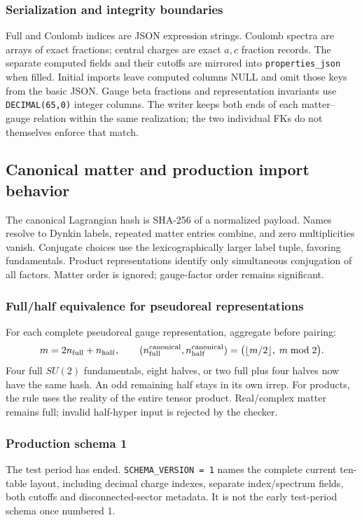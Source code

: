 \documentclass[11pt,a4paper]{article}
\numberwithin{equation}{section}
\newcommand{\code}[1]{{\small\nolinkurl{#1}}}
\begin{document}
\subsubsection{Serialization and integrity boundaries}
Full and Coulomb indices are JSON expression strings. Coulomb spectra are
arrays of exact fractions; central charges are exact $a,c$ fraction records.
The separate computed fields and their cutoffs are mirrored into
\code{properties_json} when filled. Initial imports leave computed columns
NULL and omit those keys from the basic JSON. Gauge beta
fractions and representation invariants use \code{DECIMAL(65,0)} integer
columns. The writer keeps both ends of each matter--gauge relation within the
same realization; the two individual FKs do not themselves enforce that match.

\clearpage
\subsection{Canonical matter and production import behavior}
The canonical Lagrangian hash is SHA-256 of a normalized payload. Names resolve
to Dynkin labels, repeated matter entries combine, and zero multiplicities
vanish. Conjugate choices use the lexicographically larger label tuple, favoring
fundamentals. Product representations identify only simultaneous conjugation of
all factors. Matter order is ignored; gauge-factor order remains significant.

\subsubsection{Full/half equivalence for pseudoreal representations}
For each complete pseudoreal gauge representation, aggregate before pairing:
\[
 m=2n_{\rm full}+n_{\rm half},\qquad
 (n_{\rm full}^{\rm canonical},n_{\rm half}^{\rm canonical})
 =\bigl(\lfloor m/2\rfloor,\;m\bmod2\bigr).
\]
Four full $SU(2)$ fundamentals, eight halves, or two full plus four halves now
have the same hash. An odd remaining half stays in its own irrep. For products,
the rule uses the reality of the entire tensor product. Real/complex matter
remains full; invalid half-hyper input is rejected by the checker.

\subsubsection{Production schema 1}
The test period has ended. \code{SCHEMA_VERSION = 1} names the complete current
ten-table layout, including decimal charge indexes, separate index/spectrum
fields, both cutoffs and disconnected-sector metadata. It is not the early
test-period schema once numbered 1.
\end{document}
